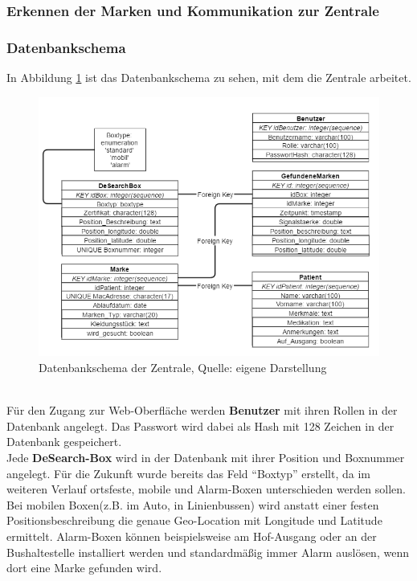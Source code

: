 \subsubsection{Erkennen der Marken und Kommunikation zur Zentrale}
\subsubsection{Datenbankschema}
In Abbildung \ref{img:db-schema} ist das Datenbankschema zu sehen, mit dem die Zentrale arbeitet. 
\begin{figure}
	\centering
	\includegraphics[width=1.0\linewidth]{images/db-schema}
	\caption[Datenbankschema der Zentrale]{Datenbankschema der Zentrale, Quelle: eigene Darstellung}
	\label{img:db-schema}
\end{figure}
\\Für den Zugang zur Web-Oberfläche werden \textbf{Benutzer} mit ihren Rollen in der Datenbank angelegt. Das Passwort wird dabei als Hash mit 128 Zeichen in der Datenbank gespeichert. 
\\Jede \textbf{DeSearch-Box} wird in der Datenbank mit ihrer Position und Boxnummer angelegt. Für die Zukunft wurde bereits das Feld \enquote{Boxtyp} erstellt, da im weiteren Verlauf ortsfeste, mobile und Alarm-Boxen unterschieden werden sollen. Bei mobilen Boxen(z.B. im Auto, in Linienbussen) wird anstatt einer festen Positionsbeschreibung die genaue Geo-Location mit Longitude und Latitude ermittelt. Alarm-Boxen können beispielsweise am Hof-Ausgang oder an der Bushaltestelle installiert werden und standardmäßig immer Alarm auslösen, wenn dort eine Marke gefunden wird.
